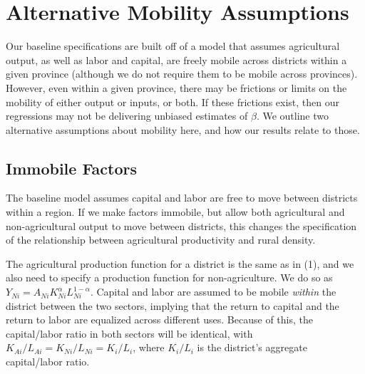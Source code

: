 \documentclass[11pt]{article}
\begin{document}
\section{Alternative Mobility Assumptions}
Our baseline specifications are built off of a model that assumes agricultural output, as well as labor and capital, are freely mobile across districts within a given province (although we do not require them to be mobile across provinces). However, even within a given province, there may be frictions or limits on the mobility of either output or inputs, or both. If these frictions exist, then our regressions may not be delivering unbiased estimates of $\beta$. We outline two alternative assumptions about mobility here, and how our results relate to those. 

\subsection{Immobile Factors}
The baseline model assumes capital and labor are free to move between districts within a region. If we make factors immobile, but allow both agricultural and non-agricultural output to move between districts, this changes the specification of the relationship between agricultural productivity and rural density. 

The agricultural production function for a district is the same as in (1), and we also need to specify a production function for non-agriculture. We do so as $Y_{Ni} = A_{Ni} K_{Ni}^{\alpha} L_{Ni}^{1-\alpha}$. Capital and labor are assumed to be mobile \textit{within} the district between the two sectors, implying that the return to capital and the return to labor are equalized across different uses. Because of this, the capital/labor ratio in both sectors will be identical, with $K_{Ai}/L_{Ai} = K_{Ni}/L_{Ni} = K_i/L_i$, where $K_i/L_i$ is the district's aggregate capital/labor ratio. 
\end{document}
